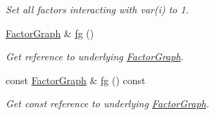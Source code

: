 \begin{CompactItemize}
\begin{CompactList}\small\item\em Set all factors interacting with var(i) to 1. \item\end{CompactList}\item 
\hypertarget{classdai_1_1DAIAlg_9348542c22d04ed804388f1fe3009fa3}{
\hyperlink{classdai_1_1FactorGraph}{FactorGraph} \& \hyperlink{classdai_1_1DAIAlg_9348542c22d04ed804388f1fe3009fa3}{fg} ()}
\label{classdai_1_1DAIAlg_9348542c22d04ed804388f1fe3009fa3}

\begin{CompactList}\small\item\em Get reference to underlying \hyperlink{classdai_1_1FactorGraph}{FactorGraph}. \item\end{CompactList}\item 
\hypertarget{classdai_1_1DAIAlg_35400e471b8c3c98bef6c74ceac8fa16}{
const \hyperlink{classdai_1_1FactorGraph}{FactorGraph} \& \hyperlink{classdai_1_1DAIAlg_35400e471b8c3c98bef6c74ceac8fa16}{fg} () const }
\label{classdai_1_1DAIAlg_35400e471b8c3c98bef6c74ceac8fa16}

\begin{CompactList}\small\item\em Get const reference to underlying \hyperlink{classdai_1_1FactorGraph}{FactorGraph}. \item\end{CompactList}\end{CompactItemize}
